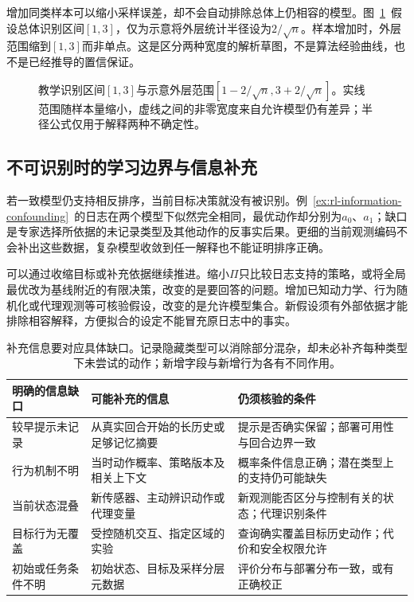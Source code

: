 增加同类样本可以缩小采样误差，却不会自动排除总体上仍相容的模型。图~\ref{fig:rl-information-identification-width}~假设总体识别区间$[1,3]$，仅为示意将外层统计半径设为$2/\sqrt n$。样本增加时，外层范围缩到$[1,3]$而非单点。这是区分两种宽度的解析草图，不是算法经验曲线，也不是已经推导的置信保证。

\begin{figure}[htbp]
  \centering
  
  \caption{教学识别区间$[1,3]$与示意外层范围$[1-2/\sqrt n,3+2/\sqrt n]$。实线范围随样本量缩小，虚线之间的非零宽度来自允许模型仍有差异；半径公式仅用于解释两种不确定性。}
  \label{fig:rl-information-identification-width}
\end{figure}

\subsection{不可识别时的学习边界与信息补充}
\label{sec:rl-information-unidentifiable}

若一致模型仍支持相反排序，当前目标决策就没有被识别。例~\ref{ex:rl-information-confounding}~的日志在两个模型下似然完全相同，最优动作却分别为$a_0$、$a_1$；缺口是专家选择所依据的未记录类型及其他动作的反事实后果。更细的当前观测编码不会补出这些数据，复杂模型收敛到任一解释也不能证明排序正确。

可以通过收缩目标或补充依据继续推进。缩小$\Pi$只比较日志支持的策略，或将全局最优改为基线附近的有限决策，改变的是要回答的问题。增加已知动力学、行为随机化或代理观测等可核验假设，改变的是允许模型集合。新假设须有外部依据才能排除相容解释，方便拟合的设定不能冒充原日志中的事实。

\begin{table}[htbp]
  \centering
  \small
  \begin{tabularx}{\linewidth}{p{26mm}XX}
    \toprule
    明确的信息缺口 & 可能补充的信息 & 仍须核验的条件 \\
    \midrule
    较早提示未记录 & 从真实回合开始的长历史或足够记忆摘要 & 提示是否确实保留；部署可用性与回合边界一致 \\
    行为机制不明 & 当时动作概率、策略版本及相关上下文 & 概率条件信息正确；潜在类型上的支持仍可能缺失 \\
    当前状态混叠 & 新传感器、主动辨识动作或代理变量 & 新观测能否区分与控制有关的状态；代理识别条件 \\
    目标行为无覆盖 & 受控随机交互、指定区域的实验 & 查询确实覆盖目标历史动作；代价和安全权限允许 \\
    初始或任务条件不明 & 初始状态、目标及采样分层元数据 & 评价分布与部署分布一致，或有正确校正 \\
    \bottomrule
  \end{tabularx}
  \caption{补充信息要对应具体缺口。记录隐藏类型可以消除部分混杂，却未必补齐每种类型下未尝试的动作；新增字段与新增行为各有不同作用。}
  \label{tab:rl-information-information-repair}
\end{table}

